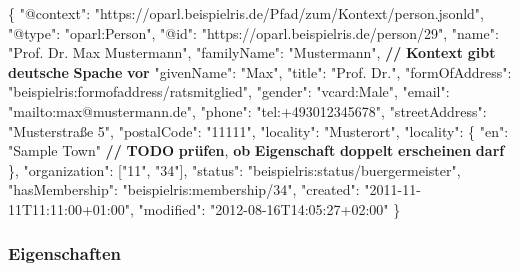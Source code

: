 \documentclass[,a4paper]{article}
\newenvironment{Shaded}{}{}
\newcommand{\DataTypeTok}[1]{\textcolor[rgb]{0.56,0.13,0.00}{{#1}}}
\newcommand{\StringTok}[1]{\textcolor[rgb]{0.25,0.44,0.63}{{#1}}}
\newcommand{\ErrorTok}[1]{\textcolor[rgb]{1.00,0.00,0.00}{\textbf{{#1}}}}
\newcommand{\NormalTok}[1]{{#1}}
\begin{document}
\begin{Shaded}
\begin{Highlighting}[]
\NormalTok{\{}
    \DataTypeTok{"@context"}\NormalTok{: }\StringTok{"https://oparl.beispielris.de/Pfad/zum/Kontext/person.jsonld"}\NormalTok{,}
    \DataTypeTok{"@type"}\NormalTok{: }\StringTok{"oparl:Person"}\NormalTok{,}
    \DataTypeTok{"@id"}\NormalTok{: }\StringTok{"https://oparl.beispielris.de/person/29"}\NormalTok{,}
    \DataTypeTok{"name"}\NormalTok{: }\StringTok{"Prof. Dr. Max Mustermann"}\NormalTok{,}
    \DataTypeTok{"familyName"}\NormalTok{: }\StringTok{"Mustermann"}\NormalTok{, }\ErrorTok{//} \ErrorTok{Kontext} \ErrorTok{gibt} \ErrorTok{deutsche} \ErrorTok{Spache} \ErrorTok{vor}
    \DataTypeTok{"givenName"}\NormalTok{: }\StringTok{"Max"}\NormalTok{,}
    \DataTypeTok{"title"}\NormalTok{: }\StringTok{"Prof. Dr."}\NormalTok{,}
    \DataTypeTok{"formOfAddress"}\NormalTok{: }\StringTok{"beispielris:formofaddress/ratsmitglied"}\NormalTok{,}
    \DataTypeTok{"gender"}\NormalTok{: }\StringTok{"vcard:Male"}\NormalTok{,}
    \DataTypeTok{"email"}\NormalTok{: }\StringTok{"mailto:max@mustermann.de"}\NormalTok{,}
    \DataTypeTok{"phone"}\NormalTok{: }\StringTok{"tel:+493012345678"}\NormalTok{,}
    \DataTypeTok{"streetAddress"}\NormalTok{: }\StringTok{"Musterstraße 5"}\NormalTok{,}
    \DataTypeTok{"postalCode"}\NormalTok{: }\StringTok{"11111"}\NormalTok{,}
    \DataTypeTok{"locality"}\NormalTok{: }\StringTok{"Musterort"}\NormalTok{,}
    \DataTypeTok{"locality"}\NormalTok{: \{}
        \DataTypeTok{"en"}\NormalTok{: }\StringTok{"Sample Town"} \ErrorTok{//} \ErrorTok{TODO} \ErrorTok{prüfen}\NormalTok{, }\ErrorTok{ob} \ErrorTok{Eigenschaft} \ErrorTok{doppelt} \ErrorTok{erscheinen} \ErrorTok{darf}
    \NormalTok{\},}
    \DataTypeTok{"organization"}\NormalTok{: [}\StringTok{"11"}\NormalTok{, }\StringTok{"34"}\NormalTok{],}
    \DataTypeTok{"status"}\NormalTok{: }\StringTok{"beispielris:status/buergermeister"}\NormalTok{,}
    \DataTypeTok{"hasMembership"}\NormalTok{: }\StringTok{"beispielris:membership/34"}\NormalTok{,}
    \DataTypeTok{"created"}\NormalTok{: }\StringTok{"2011-11-11T11:11:00+01:00"}\NormalTok{,}
    \DataTypeTok{"modified"}\NormalTok{: }\StringTok{"2012-08-16T14:05:27+02:00"}
\NormalTok{\}}
\end{Highlighting}
\end{Shaded}

\subsubsection{Eigenschaften}\label{eigenschaften-3}
\end{document}
